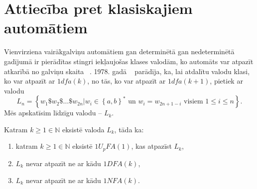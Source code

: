\documentclass{ludis}
\begin{document}
\section{Attiecība pret klasiskajiem automātiem}
Vienvirziena vairākgalviņu automātiem gan determinētā gan nedeterminētā gadījumā ir pierādītas stingri iekļaujošas klases valodām, ko automāts var atpazīt atkarībā no galviņu skaita ~\citep{Holzer2009,Yao1978}. 1978. gadā ~\citet{Yao1978} parādīja, ka, lai atdalītu valodu klasi, ko var atpazīt ar $1dfa(k)$, no tās, ko var atpazīt ar $1dfa(k+1)$, pietiek ar valodu
\[
	L_n = \left\{w_1\$w_2\$ \ldots \$w_{2n} | w_i \in \left\{a,b\right\}^* \textrm{ un } w_i = w_{2n+1−i} \textrm{ visiem } 1 \leq i \leq n \right\}.
\]
Mēs apskatīsim līdzīgu valodu -- $L_k$.
\begin{teorema}
Katram $k \geq 1 \in \mathbb{N}$ eksistē valoda $L_k$, tāda ka:
\begin{enumerate}[label={(\arabic*)}]
	\item katram $k \geq 1 \in \mathbb{N}$ eksistē $1U_pFA(1)$, kas atpazīst $L_k$,
	\item $L_k$ nevar atpazīt ne ar kādu $1DFA(k)$,
	\item $L_k$ nevar atpazīt ne ar kādu $1NFA(k)$.
\end{enumerate}
\end{teorema}
\end{document}

